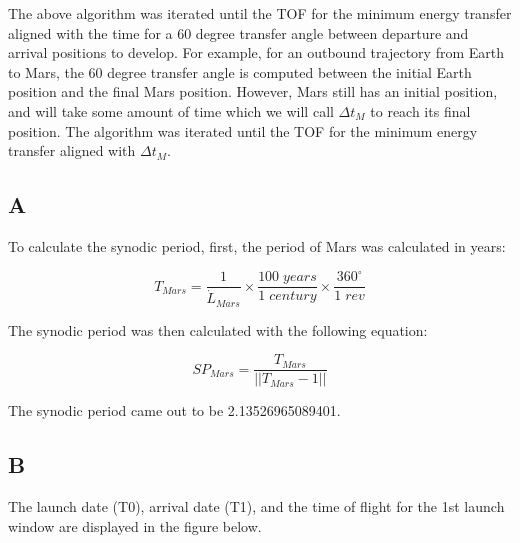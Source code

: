 \documentclass[conf]{new-aiaa}
\begin{document}
The above algorithm was iterated until the TOF for the minimum energy transfer aligned with the time for a 60 degree transfer angle between departure and arrival positions to develop. For example, for an outbound trajectory from Earth to Mars, the 60 degree transfer angle is computed between the initial Earth position and the final Mars position. However, Mars still has an initial position, and will take some amount of time which we will call $\Delta t_M$ to reach its final position. The algorithm was iterated until the TOF for the minimum energy transfer aligned with $\Delta t_M$.  


\subsection*{A}

To calculate the synodic period, first, the period of Mars was calculated in years: 

\begin{equation}
    T_{Mars} = \frac{1}{\dot{L}_{Mars}} \times \frac{100 \; years}{1 \; century} \times \frac{360 ^\circ}{1 \; rev}
\end{equation}

The synodic period was then calculated with the following equation: 

\begin{equation}
    SP_{Mars} = \frac{T_{Mars}}{|| T_{Mars} - 1 ||}
\end{equation}

The synodic period came out to be 2.13526965089401. 

\subsection*{B}

The launch date (T0), arrival date (T1), and the time of flight for the 1st launch window are displayed in the figure below. 
\end{document}
